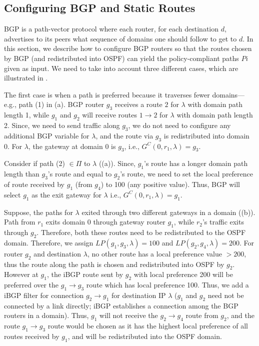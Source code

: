 \subsection{Configuring BGP and Static Routes}
BGP is a path-vector protocol where each router,
for each destination $d$,
advertises to its peers
what sequence of domains one should follow to get to  $d$.  
In this section, we describe how to configure
BGP routers so that the routes chosen by BGP (and redistributed into OSPF) 
can yield the policy-compliant
paths $Pi$ given as input. 
We need to take into account three different
cases, which are illustrated in .  

The first case is when a path is preferred because it traverses fewer domains---e.g., path (1)  in (a).
BGP router $g_3$ receives a route $2$ for $\lambda$ with domain path length 1, 
while $g_1$ and $g_2$ will receive routes $1 \rightarrow 2$ 
for $\lambda$ with 
domain path length 2. Since, we need to send traffic along
$g_3$, we do not need to configure any additional BGP variable for $\lambda$,
and the route via $g_3$ is redistributed into domain 0. 
For $\lambda$, the gateway at domain 0 is $g_3$, i.e.,
$G^C(0, r_1, \lambda) = g_3$.

Consider if path (2) $\in \Pi$ to $\lambda$ 
((a)). Since, $g_1$'s route has a longer domain 
path length than $g_3$'s route and equal to $g_2$'s route,
we need to set the local preference of route received by $g_1$ 
(from $g_4$) to 100 (any positive value). Thus, BGP 
will select $g_1$ as the exit gateway for $\lambda$ i.e.,
$G^C(0, r_1, \lambda) = g_1$.

Suppose, the paths for $\lambda$ exited through two different
gateways in a domain ((b)).
Path from $r_1$ exits domain 0 through 
gateway router $g_1$, while $r_2$'s traffic exits 
through $g_2$. 
Therefore, both these routes need to be 
redistributed to the OSPF domain. 
Therefore, we assign
$LP(g_1,g_3,\lambda) = 100$ and $LP(g_2,g_4,\lambda) = 200$. For 
router $g_2$ and destination $\lambda$, 
no other route has a local preference value $>200$, thus 
the route along the path is chosen and redistributed into 
OSPF by $g_2$. However at $g_1$, the iBGP route
sent by $g_2$ with local preference 200 will be preferred over
the $g_1\rightarrow g_3$ route which has local preference 100.
Thus, we add a iBGP filter for connection $g_2 \rightarrow g_1$ for
destination IP $\lambda$ ($g_1$ and $g_2$ need not be connected by a 
link directly; iBGP establishes a connection among the 
BGP routers in a domain). Thus, $g_1$ will not receive the
$g_2 \rightarrow g_4$ route from $g_2$, and the route $g_1 \rightarrow
g_3$ route would be chosen as it has the highest local preference
of all routes received by $g_1$, and will be redistributed into the 
OSPF domain. 

